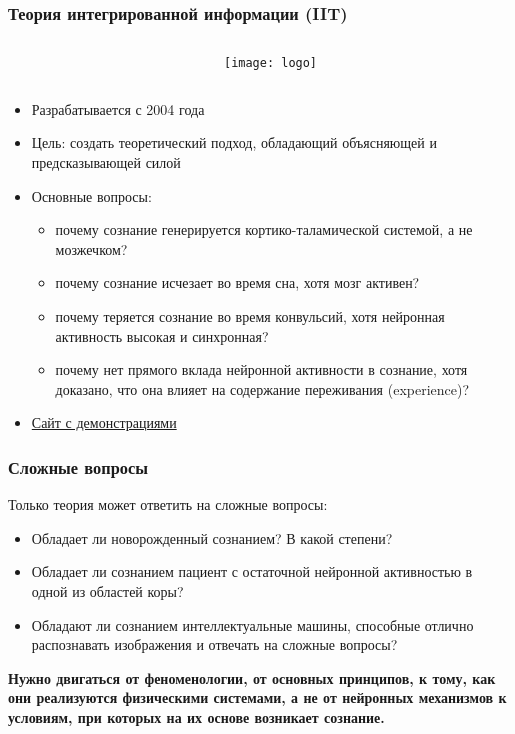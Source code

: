 \documentclass[default]{beamer}
\begin{document}
	\begin{frame}
		\frametitle{Теория интегрированной информации (IIT)}
		
		\begin{columns}
			\begin{column}{0.9\textwidth}
				\nocite{*}
				\printbibliography[keyword={iit}]
			\end{column}
			\begin{column}{0.1\textwidth}
				\begin{figure}
					\texttt{[image: logo]}
				\end{figure}
			\end{column}
		\end{columns}

		\begin{itemize}
			\item Разрабатывается с 2004 года
			\item Цель: создать теоретический подход, обладающий объясняющей и предсказывающей силой
			\item Основные вопросы:
				\begin{itemize}
					\item почему сознание генерируется кортико-таламической системой, а не мозжечком?
					\item почему сознание исчезает во время сна, хотя мозг активен?
					\item почему теряется сознание во время конвульсий, хотя нейронная активность высокая и синхронная?
					\item почему нет прямого вклада нейронной активности в сознание, хотя доказано, что она влияет на содержание переживания (experience)?
				\end{itemize}
			\item \href{http://integratedinformationtheory.org/}{Сайт с демонстрациями}
		\end{itemize}		
	\end{frame}	


	\begin{frame}
		\frametitle{Сложные вопросы}
		
		Только теория может ответить на сложные вопросы:
		\begin{itemize}
			\item  Обладает ли новорожденный сознанием? В какой степени?
			\item Обладает ли сознанием пациент с остаточной нейронной активностью в одной из областей коры?
			\item Обладают ли сознанием интеллектуальные машины, способные отлично распознавать изображения и отвечать на сложные вопросы?
		\end{itemize}
		\par\bigskip
		\textbf{Нужно двигаться от феноменологии, от основных принципов, к тому, как они реализуются физическими системами, а не от нейронных механизмов к условиям, при которых на их основе возникает сознание.}
	\end{frame}		
	
\end{document}
